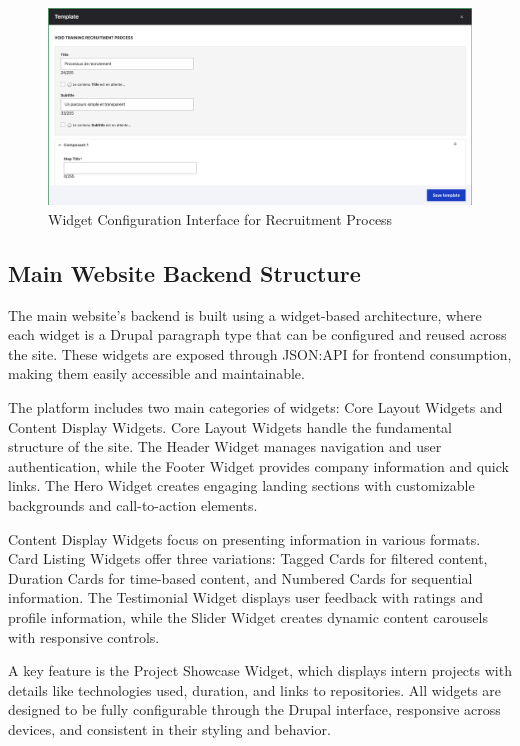 \begin{figure}[H]
    \centering
    \includegraphics[width=\textwidth]{images/widget_content.png}
    \caption{Widget Configuration Interface for Recruitment Process}
    \label{fig:widget_content}
\end{figure}


\subsection{Main Website Backend Structure}
The main website's backend is built using a widget-based architecture, where each widget is a Drupal paragraph type that can be configured and reused across the site. These widgets are exposed through JSON:API for frontend consumption, making them easily accessible and maintainable.

The platform includes two main categories of widgets: Core Layout Widgets and Content Display Widgets. Core Layout Widgets handle the fundamental structure of the site. The Header Widget manages navigation and user authentication, while the Footer Widget provides company information and quick links. The Hero Widget creates engaging landing sections with customizable backgrounds and call-to-action elements.

Content Display Widgets focus on presenting information in various formats. Card Listing Widgets offer three variations: Tagged Cards for filtered content, Duration Cards for time-based content, and Numbered Cards for sequential information. The Testimonial Widget displays user feedback with ratings and profile information, while the Slider Widget creates dynamic content carousels with responsive controls.

A key feature is the Project Showcase Widget, which displays intern projects with details like technologies used, duration, and links to repositories. All widgets are designed to be fully configurable through the Drupal interface, responsive across devices, and consistent in their styling and behavior.

